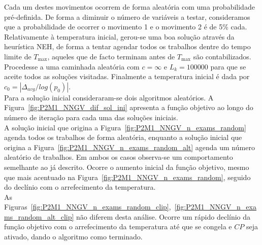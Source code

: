 Cada um destes movimentos ocorrem de forma aleatória com uma probabilidade pré-definida. De forma a diminuir o número de variáveis a testar, consideramos que a probabilidade de ocorrer o movimento 1 e o movimento 2 é de 5\% cada.\\

Relativamente à temperatura inicial, gerou-se uma boa solução através da heurística NEH, de forma a tentar agendar todos os trabalhos dentre do tempo limite de $T_{\max}$, aqueles que de facto terminam antes de $T_{\max}$ são contabilizados. Procedesse a uma caminhada aleatória com $c=\infty$ e $L_{k}=100000$ para que se aceite todos as soluções visitadas. Finalmente a temperatura inicial é dada por $c_{0}=|\Delta_{avg}/log(p_{0})|$.\\

Para a solução inicial consideraram-se dois algoritmos aleatórios. A Figura~\ref{fig:P2M1_NNGV_dif_sol_ini} apresenta a função objetivo ao longo do número de iteração para cada uma das soluções iniciais.\\

A solução inicial que origina a Figura~\ref{fig:P2M1_NNGV_n_exams_random} agenda todos os trabalhos de forma aleatória, enquanto a solução inicial que origina a Figura~\ref{fig:P2M1_NNGV_n_exams_random_alt} agenda um número aleatório de trabalhos. Em ambos os casos observa-se um comportamento semelhante ao já descrito. Ocorre o aumento inicial da função objetivo, mesmo que mais acentuado na Figura~\ref{fig:P2M1_NNGV_n_exams_random}, seguido do declínio com o arrefecimento da temperatura.\\

As Figuras~\ref{fig:P2M1_NNGV_n_exams_random_clip},~\ref{fig:P2M1_NNGV_n_exams_random_alt_clip} não diferem desta análise. Ocorre um rápido declínio da função objetivo com o arrefecimento da temperatura até que se congela e $CP$ seja ativado, dando o algoritmo como terminado.\\

